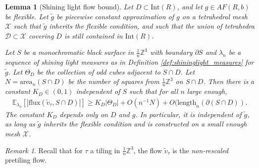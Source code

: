 \documentclass[11pt]{article}
\newtheorem{lemma}[thm]{Lemma}
\theoremstyle{remark}
\newtheorem{rem}[thm]{Remark}
\theoremstyle{definition}
\newcommand{\mc}[1]{\mathcal{#1}}
\newcommand{\m}[1]{\mathbb{#1}}
\begin{document}
\begin{lemma}[Shining light flow bound]\label{lemma:shininglight_flowbound}
    Let $D\subset \text{Int}(R)$, and let $g\in AF(R,b)$ be flexible. Let $\widetilde g$ be piecewise constant approximation of $g$ on a tetrahedral mesh $\mc X$ such that $\widetilde g$ inherits the flexible condition, and such that the union of tetrahedra $\mc D\subset \mc X$ covering $D$ is still contained in $\text{Int}(R)$.
    
     Let $S$ be a monochromatic black surface in $\frac{1}{n}\m Z^3$ with boundary $\partial S$ and $\lambda_n$ be a sequence of shining light measures as in Definition \ref{def:shininglight_measures} for $\widetilde g$. Let $\Theta_D$ be the collection of odd cubes adjacent to $S\cap D$. Let $N = \text{area}_n(S\cap D)$ be the number of squares from $\frac{1}{n} \m Z^3$ on $S\cap D$. Then there is a constant $K_D\in (0,1)$ independent of $S$ such that for all $n$ large enough,
     \begin{align*}
         \m E_{\lambda_n}[|\text{flux}(\widetilde v_\tau,S\cap D)|]\geq K_{D} |\Theta_{D}| +O(n^{-1}N) + O(\text{length}_n(\partial(S\cap D)).
     \end{align*}
     The constant $K_D$ depends only on $D$ and $g$. In particular, it is independent of $\widetilde g$, as long as $\widetilde g$ inherits the flexible condition and is constructed on a small enough mesh $\mc X$. 
\end{lemma}
\begin{rem}
    Recall that for $\tau$ a tiling in $\frac{1}{n}\m Z^3$, the flow $\widetilde v_\tau$ is the \textit{non-rescaled} pretiling flow. 
\end{rem}
\end{document}
